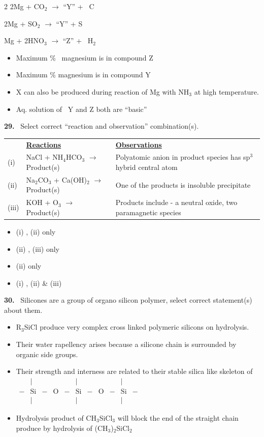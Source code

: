 \documentclass[10pt]{extarticle}
\newcommand{\qn}[1]{\par\smallskip\noindent\textbf{#1.}~}
\newenvironment{qoptions}{\begin{itemize}[leftmargin=1.8em,itemsep=1pt,topsep=2pt,label={}]}{\end{itemize}}
\newcommand{\opt}[2]{\item[(#1)] #2}
\begin{document}
\begin{multicols}{2}
2Mg + CO$_2$ $\to$ ``Y'' + \ C\par
2Mg + SO$_2$ $\to$ ``Y'' + S\par
Mg + 2HNO$_3$ $\to$ ``Z'' + \ H$_2$
\begin{qoptions}
\opt{A}{Maximum \% \ magnesium is in compound Z}
\opt{B}{Maximum \% magnesium is in compound Y}
\opt{C}{X can also be produced during reaction of Mg with NH$_3$ at high temperature.}
\opt{D}{Aq. solution of \ Y and Z both are ``basic''}
\end{qoptions}
\qn{29} Select correct ``reaction and observation'' combination(s).\par
\begin{tabular}{@{}l p{3.4cm} p{3.4cm}@{}}
 & \underline{\textbf{Reactions}} & \underline{\textbf{Observations}}\\
(i) & NaCl + NH$_4$HCO$_3$ $\longrightarrow$ Product(s) & Polyatomic anion in product species has sp$^3$ hybrid central atom\\
(ii) & Na$_2$CO$_3$ + Ca(OH)$_2$ $\longrightarrow$ Product(s) & One of the products is insoluble precipitate\\
(iii) & KOH + O$_3$ $\longrightarrow$ Product(s) & Products include - a neutral oxide, two paramagnetic species\\
\end{tabular}\par
\begin{qoptions}
\opt{A}{(i) , (ii) only}
\opt{B}{(ii) , (iii) only}
\opt{C}{(ii) only}
\opt{D}{(i) , (ii) \& (iii)}
\end{qoptions}
\qn{30} Silicones are a group of organo silicon polymer, select correct statement(s) about them.
\begin{qoptions}
\opt{A}{R$_3$SiCl produce very complex cross linked polymeric silicons on hydrolysis.}
\opt{B}{Their water rapellency arises because a silicone chain is surrounded by organic side groups.}
\opt{C}{Their strength and interness are related to their stable silica like skeleton of $\begin{array}{*{11}{c}} & | &  &  &  & | &  &  &  & | & \\{-} & \mathrm{Si} & {-} & \mathrm O & {-} & \mathrm{Si} & {-} & \mathrm O & {-} & \mathrm{Si} & {-}\\ & | &  &  &  & | &  &  &  & | & \end{array}$}
\opt{D}{Hydrolysis product of CH$_3$SiCl$_3$ will block the end of the straight chain produce by hydrolysis of (CH$_3$)$_2$SiCl$_2$}
\end{qoptions}

\end{multicols}
\end{document}
